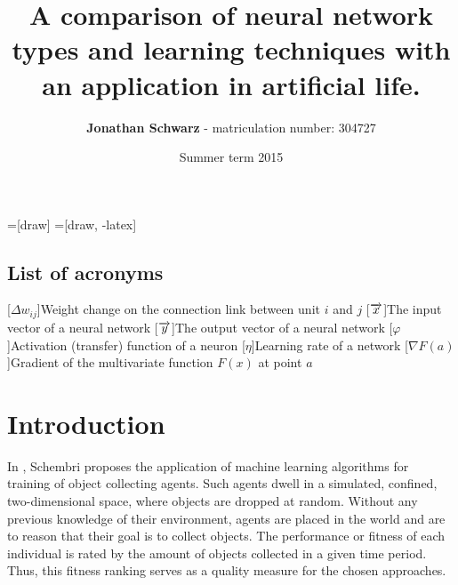 \documentclass[10pt,a4paper,DIV=11]{scrreprt}
\title
{
     A comparison of neural network types and learning techniques with an application in artificial life.
}
\author
{
    \textbf{Jonathan Schwarz} - matriculation number: 304727
}
\date
{
    Summer term 2015
}
\begin{document}
=[draw]
=[draw, -latex] 


\maketitle
\thispagestyle{empty}
\newpage
{\large\tableofcontents}
\newpage

\thispagestyle{empty}

\section*{List of acronyms}
\begin{acronym}
    [$\Delta w_{ij}$]{Weight change  on the connection link between unit $i$ and $j$}
    [$\protect \overrightarrow{x}$]{The input vector of a neural network}
    [$\protect \overrightarrow{y}$]{The output vector of a neural network}
    [$\varphi$]{Activation (transfer) function of a neuron}
    [$\eta$]{Learning rate of a network}
    [$\nabla F(a)$]{Gradient of the multivariate function $F(x)$ at point $a$}
\end{acronym}

\newpage

\chapter{Introduction}
\label{ch:intro}
In \cite{DANIEL}, Schembri proposes the application of machine learning algorithms for training of object collecting agents. 
Such agents dwell in a simulated, confined, two-dimensional space, where objects are dropped at random. Without any previous knowledge of 
their environment, agents are placed in the world and are to reason that their goal is to collect objects. The performance or fitness of each 
individual is rated by the amount of objects collected in a given time period. Thus, this fitness ranking serves as a quality measure for the 
chosen approaches.
\end{document}
